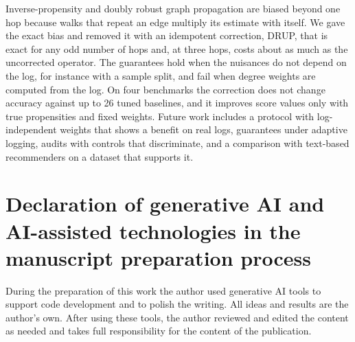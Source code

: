 \documentclass[preprint,review,12pt,authoryear]{elsarticle}
\theoremstyle{definition}
\begin{document}
Inverse-propensity and doubly robust graph propagation are biased beyond one hop
because walks that repeat an edge multiply its estimate with itself. We gave the
exact bias and removed it with an idempotent correction, DRUP, that is exact for any odd
number of hops and, at three hops, costs about as much as the uncorrected operator.
The guarantees hold when the nuisances do not depend on the log, for instance with a
sample split, and fail when degree weights are computed from the log. On four
benchmarks the correction does not change accuracy against up to 26 tuned baselines,
and it improves score values only with true propensities and fixed weights. Future work
includes a protocol with log-independent weights that shows a benefit on real logs,
guarantees under adaptive logging, audits with controls that discriminate, and a
comparison with text-based recommenders on a dataset that supports it.


\section*{Declaration of generative AI and AI-assisted technologies in the manuscript preparation process}
During the preparation of this work the author used generative AI tools to
support code development and to polish the writing. All ideas and results are
the author's own. After using these tools, the author reviewed and edited the
content as needed and takes full responsibility for the content of the
publication.




\appendix
\end{document}
